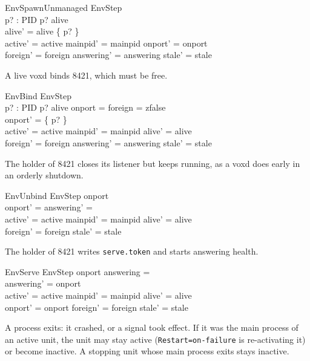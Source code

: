 \documentclass[a4paper,10pt,fleqn]{article}
\begin{document}
\begin{schema}{EnvSpawnUnmanaged}
  EnvStep \\
  p? : PID
\where
  p? \notin alive \\
  alive' = alive \cup \{ p? \} \\
  active' = active \land mainpid' = mainpid \land onport' = onport \\
  foreign' = foreign \land answering' = answering \land stale' = stale
\end{schema}

A live voxd binds 8421, which must be free.

\begin{schema}{EnvBind}
  EnvStep \\
  p? : PID
\where
  p? \in alive \land onport = \emptyset \land foreign = zfalse \\
  onport' = \{ p? \} \\
  active' = active \land mainpid' = mainpid \land alive' = alive \\
  foreign' = foreign \land answering' = answering \land stale' = stale
\end{schema}

The holder of 8421 closes its listener but keeps running, as a voxd does
early in an orderly shutdown.

\begin{schema}{EnvUnbind}
  EnvStep
\where
  onport \neq \emptyset \\
  onport' = \emptyset \land answering' = \emptyset \\
  active' = active \land mainpid' = mainpid \land alive' = alive \\
  foreign' = foreign \land stale' = stale
\end{schema}

The holder of 8421 writes \texttt{serve.token} and starts answering health.

\begin{schema}{EnvServe}
  EnvStep
\where
  onport \neq \emptyset \land answering = \emptyset \\
  answering' = onport \\
  active' = active \land mainpid' = mainpid \land alive' = alive \\
  onport' = onport \land foreign' = foreign \land stale' = stale
\end{schema}

A process exits: it crashed, or a signal took effect. If it was the main
process of an active unit, the unit may stay active
(\texttt{Restart=on-failure} is re-activating it) or become inactive. A
stopping unit whose main process exits stays inactive.
\end{document}
